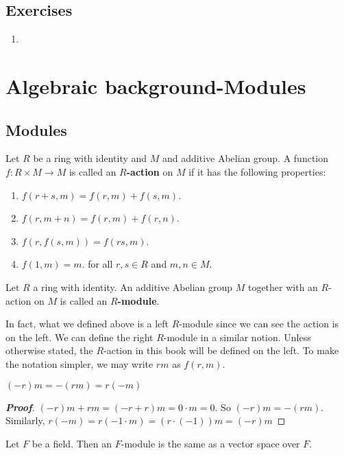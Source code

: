\subsection{Exercises}
\begin{enumerate}
\item
\end{enumerate}




\section{Algebraic background-Modules}
\subsection{Modules}
\begin{definition} Let $R$ be a ring with identity and $M$ and additive Abelian group. A function
$f: R \times M \rightarrow M$ is called an {\bf $R$-action} on $M$ if it has the following properties:
\begin{enumerate}
\item $f(r+s,m)=f(r,m)+f(s,m)$.
\item $f(r,m+n)=f(r,m)+f(r,n)$.
\item $f(r,f(s,m))=f(rs,m)$.
\item $f(1,m)=m$.
for all $r,s \in R$ and $m,n \in M$.
\end{enumerate}
\end{definition}
\begin{definition} Let $R$ a ring with identity. An additive Abelian group $M$ together with an $R$-action on $M$ is called an {\bf $R$-module}.
\end{definition}
In fact, what we defined above is a left $R$-module since we can see the action is on the left. We can define the right $R$-module in a similar notion. Unless otherwise stated, the $R$-action in this book will be defined on the left. To make the notation simpler, we may write $rm$ as $f(r,m)$.
\begin{lemma} $(-r)m=-(rm)=r(-m)$
\end{lemma}
\begin{proof}[\bf Proof] $(-r)m+rm=(-r + r )m=0 \cdot m=0$. So $(-r)m=-(rm)$. Similarly,
$r(-m)=r(-1 \cdot m)=(r \cdot (-1))m=(-r)m$
\end{proof}
\begin{example} Let $F$ be a field. Then an $F$-module is the same as a vector space over $F$.
\end{example}
